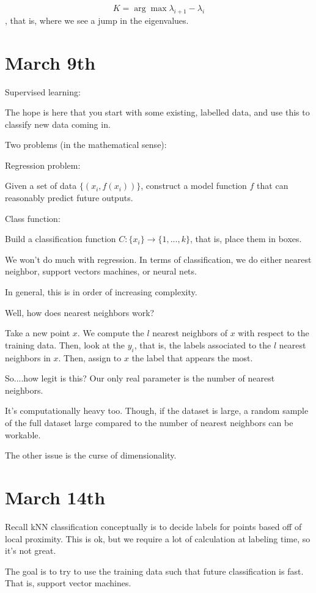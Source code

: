 \documentclass[10pt]{article}
\begin{document}
$$K = \arg \max \lambda_{i+1} - \lambda_i $$, that is, where we see a jump in the eigenvalues. 

\section*{March 9th}

Supervised learning:

The hope is here that you start with some existing, labelled data, and use this to classify new data coming in.

Two problems (in the mathematical sense):

Regression problem: 

Given a set of data $\{ (x_i, f(x_i)) \}$, construct a model function $f$ that can reasonably predict future outputs.

Class function:

Build a classification function $C: \{ x_i \} \to \{ 1,...,k\}$, that is, place them in boxes.

We won’t do much with regression. In terms of classification, we do either nearest neighbor, support vectors machines, or neural nets. 

In general, this is in order of increasing complexity. 

Well, how does nearest neighbors work?

Take a new point $x$. We compute the $l$ nearest neighbors of $x$ with respect to the training data. Then, look at the $y_i$, that is, the labels associated to the $l$ nearest neighbors in $x$. Then, assign to $x$ the label that appears the most. 

So....how legit is this? Our only real parameter is the number of nearest neighbors.

It’s computationally heavy too. Though, if the dataset is large, a random sample of the full dataset large compared to the number of nearest neighbors can be workable.

The other issue is the curse of dimensionality.

\section*{March 14th}

Recall kNN classification conceptually is to decide labels for points based off of local proximity. This is ok, but we require a lot of calculation at labeling time, so it’s not great.

The goal is to try to use the training data such that future classification is fast. That is, support vector machines.
\end{document}
